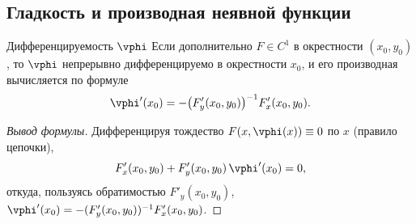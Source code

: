 \subsection*{Гладкость и производная неявной функции}

\begin{Corollary}{Дифференцируемость $\vphi$}{}
	Если дополнительно $F\in C^1$ в окрестности $(x_0,y_0)$, то $\vphi$ непрерывно
	дифференцируемо в окрестности $x_0$, и его производная вычисляется по формуле
	\[
	\vphi'(x_0)=-\bigl(F'_y(x_0,y_0)\bigr)^{-1}F'_x(x_0,y_0).
	\]
\end{Corollary}

\begin{proof}[Вывод формулы]
	Дифференцируя тождество $F(x,\vphi(x))\equiv 0$ по $x$ (правило цепочки),
	\[
	F'_x(x_0,y_0)+F'_y(x_0,y_0)\,\vphi'(x_0)=0,
	\]
	откуда, пользуясь обратимостью $F'_y(x_0,y_0)$,
	$\vphi'(x_0)=-(F'_y(x_0,y_0))^{-1}F'_x(x_0,y_0)$.
\end{proof}

